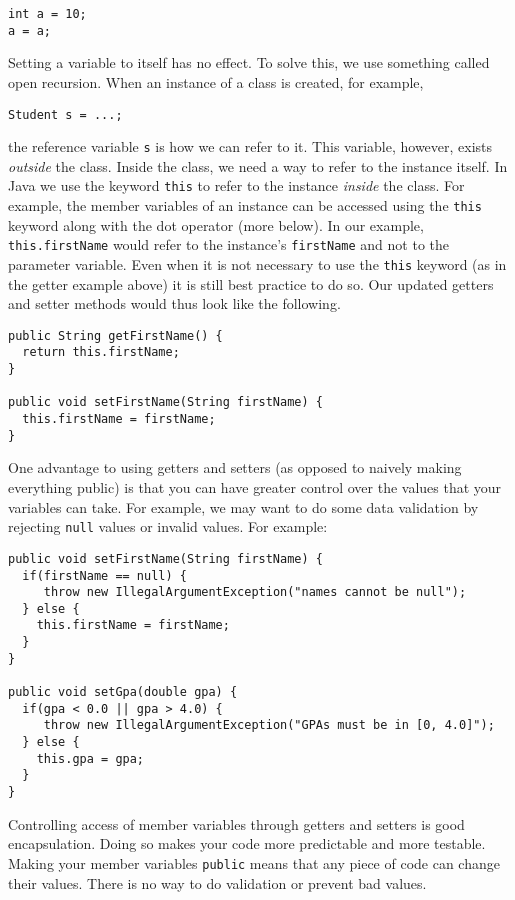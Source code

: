 \begin{verbatim}
int a = 10;
a = a;
\end{verbatim}

Setting a variable to itself has no effect.  To solve this, we use
something called \gls{open recursion}.  When an instance of a class
is created, for example, 

\texttt{Student s = ...;}

the reference variable \texttt{s} is how we can refer
to it.  This variable, however, exists \emph{outside} the class.  
Inside the class, we need a way to refer to the instance itself.
In Java we use the keyword \texttt{this} to refer to the
instance \emph{inside} the class.  For example, the member variables
of an instance can be accessed using the \texttt{this} 
keyword along with the dot operator (more below).  In our example, 
\texttt{this.firstName} would refer to the instance's
\texttt{firstName} and not to the parameter variable.
Even when it is not necessary to use the \texttt{this}
keyword (as in the getter example above) it is still best practice
to do so.  Our updated getters and setter methods would thus look like
the following.

\begin{verbatim}
public String getFirstName() {
  return this.firstName;
}

public void setFirstName(String firstName) {
  this.firstName = firstName;
} 
\end{verbatim}

One advantage to using getters and setters (as opposed to naively
making everything public) is that you can have greater control over
the values that your variables can take.  For example, we may want
to do some data validation by rejecting \texttt{null}
values or invalid values.  For example:

\begin{verbatim}
public void setFirstName(String firstName) {
  if(firstName == null) {
     throw new IllegalArgumentException("names cannot be null");
  } else {
    this.firstName = firstName;
  }
} 

public void setGpa(double gpa) {
  if(gpa < 0.0 || gpa > 4.0) {
     throw new IllegalArgumentException("GPAs must be in [0, 4.0]");
  } else {
    this.gpa = gpa;
  }
} 
\end{verbatim}

Controlling access of member variables through getters and setters
is good encapsulation.  Doing so makes your code more predictable and
more testable.  Making your member variables \texttt{public}
means that any piece of code can change their values.  There is no
way to do validation or prevent bad values.  

